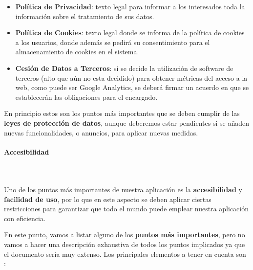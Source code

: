 \begin{itemize}
	\item \textbf{Política de Privacidad}: texto legal para informar a los interesados toda la información sobre el tratamiento de sus datos.
	
	\item \textbf{Política de Cookies}: texto legal donde se informa de la política de cookies a los usuarios, donde además se pedirá su consentimiento para el almacenamiento de cookies en el sistema.
	
	\item \textbf{Cesión de Datos a Terceros}: si se decide la utilización de software de terceros (alto que aún no esta decidido) para obtener métricas del acceso a la web, como puede ser Google Analytics, se deberá firmar un acuerdo en que se establecerán las obligaciones para el encargado.
\end{itemize}

En principio estos son los puntos más importantes que se deben cumplir de las \textbf{leyes de protección de datos}, aunque deberemos estar pendientes si se añaden nuevas funcionalidades, o anuncios, para aplicar nuevas medidas.

\paragraph{Accesibilidad}
~\\\\ Uno de los puntos más importantes de nuestra aplicación es la \textbf{accesibilidad} y \textbf{facilidad de uso}, por lo que en este aspecto se deben aplicar ciertas restricciones para garantizar que todo el mundo puede emplear nuestra aplicación con eficiencia. 

En este punto, vamos a listar alguno de los \textbf{puntos más importantes}, pero no vamos a hacer una descripción exhaustiva de todos los puntos implicados ya que el documento sería muy extenso. Los principales elementos a tener en cuenta son \cite{wai-wcag}: 

